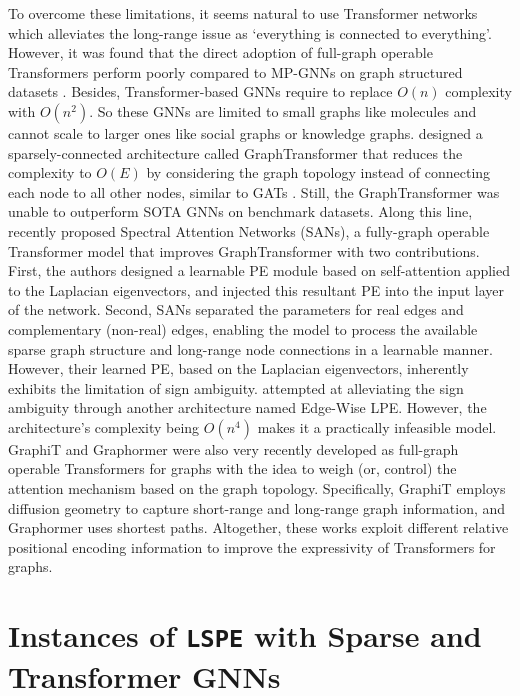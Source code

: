 \documentclass{article} \usepackage{iclr2021_conference,times}
\begin{document}
To overcome these limitations, it seems natural to use Transformer networks \citep{vaswani2017attention} which alleviates the long-range issue as `everything is connected to everything'. However, it was found that the direct adoption of full-graph operable Transformers perform poorly compared to MP-GNNs on graph structured datasets \citep{dwivedi2021generalization}. Besides, Transformer-based GNNs require to replace $O(n)$ complexity with $O(n^2)$. So these GNNs are limited to small graphs like molecules and cannot scale to larger ones like social graphs or knowledge graphs. \cite{dwivedi2021generalization} designed a sparsely-connected architecture called GraphTransformer that reduces the complexity to $O(E)$ by considering the graph topology instead of connecting each node to all other nodes, similar to GATs \citep{velivckovic2018graph}. Still, the GraphTransformer was unable to outperform SOTA GNNs on benchmark datasets. 
Along this line, \cite{kreuzer2021rethinking} recently proposed Spectral Attention Networks (SANs), a fully-graph operable Transformer model that improves GraphTransformer \citep{dwivedi2021generalization} with two contributions. First, the authors designed a learnable PE module based on self-attention 
applied to the Laplacian eigenvectors, and injected this resultant PE into the input layer of the network. Second, SANs separated the parameters for real edges and complementary (non-real) edges, enabling the model to process the available sparse graph structure and long-range node connections in a learnable manner. However, their learned PE, based on the Laplacian eigenvectors, inherently exhibits the limitation of sign ambiguity. \cite{kreuzer2021rethinking} attempted at alleviating the sign ambiguity through another architecture named Edge-Wise LPE. However, the architecture's complexity being $O(n^4)$ makes it a practically infeasible model.
GraphiT \citep{mialon2021graphit} and Graphormer \citep{ying2021transformers} were also very recently developed as full-graph operable Transformers for graphs with the idea to weigh (or, control) the attention mechanism based on the graph topology. Specifically, GraphiT employs diffusion geometry to capture short-range and long-range graph information, and Graphormer uses shortest paths. Altogether, these works exploit different relative positional encoding information to improve the expressivity of Transformers for graphs.
 

\section{Instances of \texttt{LSPE} with Sparse and Transformer GNNs}
\label{sec:model_eqns_supplementary}
\end{document}

